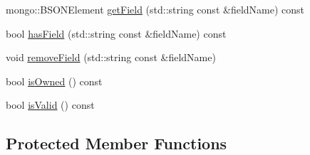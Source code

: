 \begin{DoxyCompactItemize}
mongo\-::\-B\-S\-O\-N\-Element \hyperlink{classunisys_1_1DataObj_af1e6244874e9120be943641ab566fb14}{get\-Field} (std\-::string const \&field\-Name) const 
\item 
bool \hyperlink{classunisys_1_1DataObj_afd18419bac2fddc4832c24e9e064d7df}{has\-Field} (std\-::string const \&field\-Name) const 
\item 
void \hyperlink{classunisys_1_1DataObj_ab7fdf0a4684987c6e08c82c495065e28}{remove\-Field} (std\-::string const \&field\-Name)
\item 
bool \hyperlink{classunisys_1_1DataObj_ad453f6c376abd5c49fdc05e43def437b}{is\-Owned} () const 
\item 
bool \hyperlink{classunisys_1_1DataObj_af0522a53b0cbc2399c82140da8808212}{is\-Valid} () const 
\end{DoxyCompactItemize}
\subsection*{Protected Member Functions}
